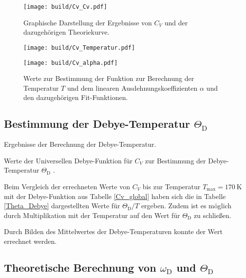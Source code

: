 \begin{figure}
	\centering
	\texttt{[image: build/Cv\_Cv.pdf]}
	\caption[]{Graphische Darstellung der Ergebnisse von $C_V$ und der dazugehörigen Theoriekurve.}
	\label{Cv_gra}
\end{figure}

\begin{figure}
	\begin{minipage}{8cm}
		\texttt{[image: build/Cv\_Temperatur.pdf]}
	\end{minipage}
	\hfill
	\begin{minipage}{8cm}
		\texttt{[image: build/Cv\_alpha.pdf]}
	\end{minipage}
	\caption[]{Werte zur Bestimmung der Funktion zur Berechnung der Temperatur $T$ und dem linearen Ausdehnungskoeffizienten $\alpha$ und den dazugehörigen Fit-Funktionen.}
\end{figure}

\subsection{Bestimmung der Debye-Temperatur $\Theta_\mathrm{D}$} %
\label{sub:bestimmung_der_debye_temperatur_theta_mathrm}

\begin{table}[!h]
	\centering
	\caption[]{Ergebnisse der Berechnung der Debye-Temperatur.}
	
	\label{Theta_Debye}
\end{table}

\begin{table}[!h]
	\centering
	\caption[]{Werte der Universellen Debye-Funktion für $C_V$ zur Bestimmung der Debye-Temperatur $\Theta_\mathrm{D}$ \cite{V47}.}
	
	\label{Cv_global}
\end{table}

Beim Vergleich der errechneten Werte von $C_V$ bis zur Temperatur $T_\text{max} = \SI{170}{\kelvin}$ mit der Debye-Funktion aus Tabelle \ref{Cv_global} haben sich die in Tabelle \ref{Theta_Debye} dargestellten Werte für $\Theta_\text{D} / T$ ergeben.
Zudem ist es möglich durch Multiplikation mit der Temperatur auf den Wert für $\Theta_\text{D}$ zu schließen.

Durch Bilden des Mittelwertes der Debye-Temperaturen konnte der Wert  errechnet werden.
\FloatBarrier
\subsection{Theoretische Berechnung von $\omega_\mathrm{D}$ und $\Theta_\mathrm{D}$} %
\label{sub:theoretische_berechnung_von_omega_mathrm}

